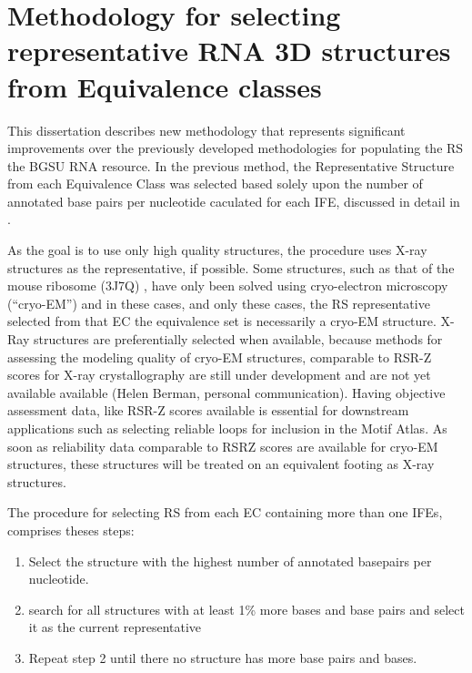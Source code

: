 \section{Methodology for selecting representative RNA 3D structures from
Equivalence classes}

This dissertation describes new methodology that represents significant
improvements over the previously developed methodologies for populating the RS
the BGSU RNA resource. In the previous method, the Representative Structure from
each Equivalence Class was selected based solely upon the number of annotated
base pairs per nucleotide caculated for each IFE, discussed in detail in
\cite{Leontis2012b}.

As the goal is to use only high quality structures, the procedure uses X-ray
structures as the representative, if possible. Some structures, such as that of
the mouse ribosome (3J7Q) \cite{Voorhees2014}, have only been solved using
cryo-electron microscopy (``cryo-EM'') and in these cases, and only these cases,
the RS representative selected from that EC the equivalence set is necessarily a
cryo-EM structure. X-Ray structures are preferentially selected when available,
because methods for assessing the modeling quality of cryo-EM structures,
comparable to RSR-Z scores for X-ray crystallography are still under development
and are not yet available available (Helen Berman, personal communication).
Having objective assessment data, like RSR-Z scores available is essential for
downstream applications such as selecting reliable loops for inclusion in the
Motif Atlas. As soon as reliability data comparable to RSRZ scores are available
for cryo-EM structures, these structures will be treated on an equivalent
footing as X-ray structures.

The procedure for selecting RS from each EC containing more than one IFEs,
comprises theses steps:

\begin{enumerate}
  \item Select the structure with the highest number of annotated basepairs per
    nucleotide.

  \item search for all structures with at least 1\% more bases and base pairs and select
    it as the current representative

  \item Repeat step 2 until there no structure has more base pairs and bases.
\end{enumerate}

